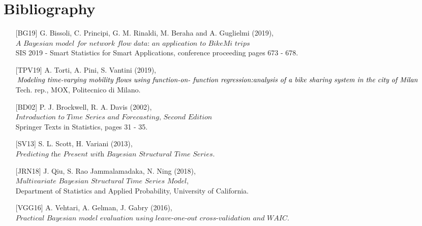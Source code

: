 \documentclass[11pt,twoside]{report}
\begin{document}
\chapter{Bibliography}
\begin{itemize}[noitemsep,topsep=0pt,parsep=0pt,partopsep=0pt,labelwidth=1.4cm,align=left,itemindent=0cm]
	\item[{[BG19]}] G. Bissoli, C. Principi, G. M. Rinaldi, M. Beraha and
	A. Guglielmi (2019),\\ $ \textit{A Bayesian model for network flow data: an application to BikeMi trips} $\\ SIS 2019 - Smart Statistics for Smart Applications, conference proceeding pages	673 - 678.
	\item[{[TPV19]}] A. Torti, A. Pini, S. Vantini (2019),\\ $ \textit{Modeling time-varying mobility flows using function-on-
	function regression:}\\ \textit{analysis of a bike sharing system in the city of Milan} $\\ Tech. rep., MOX, Politecnico di Milano.
	\item[{[BD02]}] P. J. Brockwell, R. A. Davis (2002),\\ $ \textit{Introduction to Time Series and Forecasting, Second Edition} $\\ Springer Texts in Statistics, pages 31 - 35.
	\item[{[SV13]}] S. L. Scott,
	H. Variani (2013),\\ $ \textit{Predicting the Present with Bayesian Structural Time Series} $.
	\item[{[JRN18]}] J. Qiu, S. Rao Jammalamadaka, 
	N. Ning (2018),\\ $ \textit{Multivariate Bayesian Structural Time Series Model} $,\\Department of Statistics and Applied Probability,
	University of California.
	\item[{[VGG16]}] A. Vehtari, A. Gelman, J. Gabry (2016),\\ $ \textit{Practical Bayesian model evaluation using leave-one-out cross-validation and WAIC} $.
\end{itemize}
\end{document}
